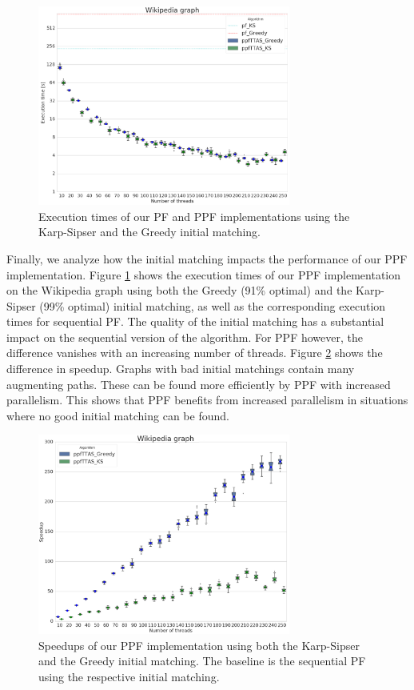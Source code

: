 \documentclass[letterpaper]{article}
\begin{document}
\begin{figure}\centering
	\includegraphics[width=8.3cm]{../../plot/output/report/wikipedia_PFvsPPFTTAS.png}
	\caption{Execution times of our PF and PPF implementations using the Karp-Sipser and the Greedy initial matching.}
	\label{fig:ksvsgreedy}
\end{figure}

Finally, we analyze how the initial matching impacts the performance of our PPF implementation. 
Figure \ref{fig:ksvsgreedy} shows the execution times of our PPF implementation on the Wi\-ki\-pe\-dia graph using both the Greedy (91\% optimal) and the Karp-Sipser (99\% optimal) initial matching,
as well as the corresponding execution times for sequential PF. 
The quality of the initial matching has a substantial impact on the sequential version of the algorithm. 
For PPF however, the difference vanishes with an increasing number of threads. 
Figure \ref{fig:ksvsgreedy_s} shows the difference in speedup. 
Graphs with bad initial matchings contain many augmenting paths. These can be found more efficiently by PPF with increased parallelism.
This shows that PPF benefits from increased parallelism in situations where no good initial matching can be found. 


\begin{figure}
	\includegraphics[width=8.3cm]{../../plot/output/report/wikipedia_GREEDYvsKS.png}
	\caption{Speedups of our PPF implementation using both the Karp-Sipser and the Greedy initial matching. The baseline is the sequential PF using the respective initial matching.}
	\label{fig:ksvsgreedy_s}
\end{figure}
\end{document}
